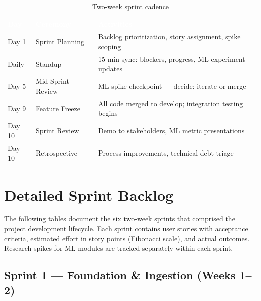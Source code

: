 \documentclass[12pt,a4paper,twoside]{report}
\begin{document}
\begin{table}[H]
\centering
\begin{tabularx}{\textwidth}{|l|l|X|}
\hline
\rowcolor{tabheader}
\textcolor{white}{\textbf{Day}} &
\textcolor{white}{\textbf{Ceremony}} &
\textcolor{white}{\textbf{Activities}} \\
\hline
Day 1 & Sprint Planning & Backlog prioritization, story assignment, spike scoping \\
\hline
Daily & Standup & 15-min sync: blockers, progress, ML experiment updates \\
\hline
Day 5 & Mid-Sprint Review & ML spike checkpoint — decide: iterate or merge \\
\hline
Day 9 & Feature Freeze & All code merged to develop; integration testing begins \\
\hline
Day 10 & Sprint Review & Demo to stakeholders, ML metric presentations \\
\hline
Day 10 & Retrospective & Process improvements, technical debt triage \\
\hline
\end{tabularx}
\caption{Two-week sprint cadence}
\end{table}

\section{Detailed Sprint Backlog}

The following tables document the six two-week sprints that comprised the project development lifecycle. Each sprint contains user stories with acceptance criteria, estimated effort in story points (Fibonacci scale), and actual outcomes. Research spikes for ML modules are tracked separately within each sprint.

\subsection{Sprint 1 — Foundation \& Ingestion (Weeks 1--2)}
\end{document}
